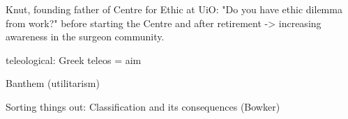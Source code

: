Knut, founding father of Centre for Ethic at UiO: "Do you have ethic dilemma from work?" before starting the Centre and after retirement -> increasing awareness in the surgeon community.

teleological: Greek teleos = aim

Banthem (utilitarism)

Sorting things out: Classification and its consequences (Bowker)